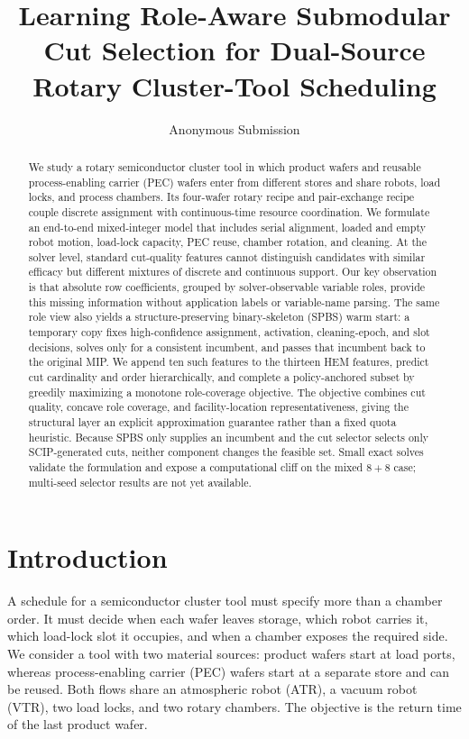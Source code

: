 \documentclass[letterpaper]{article}
\title{Learning Role-Aware Submodular Cut Selection for Dual-Source Rotary Cluster-Tool Scheduling}
\author{Anonymous Submission}
\begin{document}
\maketitle

\begin{abstract}
We study a rotary semiconductor cluster tool in which product wafers and reusable process-enabling carrier (PEC) wafers enter from different stores and share robots, load locks, and process chambers.
Its four-wafer rotary recipe and pair-exchange recipe couple discrete assignment with continuous-time resource coordination.
We formulate an end-to-end mixed-integer model that includes serial alignment, loaded and empty robot motion, load-lock capacity, PEC reuse, chamber rotation, and cleaning.
At the solver level, standard cut-quality features cannot distinguish candidates with similar efficacy but different mixtures of discrete and continuous support.
Our key observation is that absolute row coefficients, grouped by solver-observable variable roles, provide this missing information without application labels or variable-name parsing.
The same role view also yields a structure-preserving binary-skeleton (SPBS) warm start: a temporary copy fixes high-confidence assignment, activation, cleaning-epoch, and slot decisions, solves only for a consistent incumbent, and passes that incumbent back to the original MIP.
We append ten such features to the thirteen HEM features, predict cut cardinality and order hierarchically, and complete a policy-anchored subset by greedily maximizing a monotone role-coverage objective.
The objective combines cut quality, concave role coverage, and facility-location representativeness, giving the structural layer an explicit approximation guarantee rather than a fixed quota heuristic.
Because SPBS only supplies an incumbent and the cut selector selects only SCIP-generated cuts, neither component changes the feasible set.
Small exact solves validate the formulation and expose a computational cliff on the mixed $8+8$ case; multi-seed selector results are not yet available.
\end{abstract}

\section{Introduction}

A schedule for a semiconductor cluster tool must specify more than a chamber order.
It must decide when each wafer leaves storage, which robot carries it, which load-lock slot it occupies, and when a chamber exposes the required side.
We consider a tool with two material sources: product wafers start at load ports, whereas process-enabling carrier (PEC) wafers start at a separate store and can be reused.
Both flows share an atmospheric robot (ATR), a vacuum robot (VTR), two load locks, and two rotary chambers.
The objective is the return time of the last product wafer.
\end{document}

